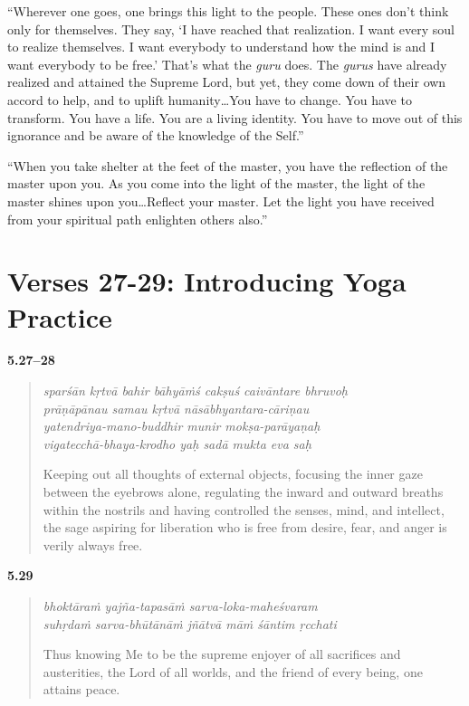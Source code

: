 \enquote{Wherever one goes, one brings this light to the people. These ones don’t think only for themselves. They say, \enquote{I have reached that realization. I want every soul to realize themselves. I want everybody to understand how the mind is and I want everybody to be free.} That’s what the \textit{guru} does. The \textit{gurus} have already realized and attained the Supreme Lord, but yet, they come down of their own accord to help, and to uplift humanity\ldots You have to change. You have to transform. You have a life. You are a living identity. You have to move out of this ignorance and be aware of the knowledge of the Self.}

\enquote{When you take shelter at the feet of the master, you have the reflection of the master upon you. As you come into the light of the master, the light of the master shines upon you\ldots Reflect your master. Let the light you have received from your spiritual path enlighten others also.}

\section{Verses 27-29: Introducing Yoga Practice}\label{sec-verses-27-29-introducing-yoga-practice}


\par\noindent\textbf{5.27–28}\par
\begin{verse}
\textit{sparśān kṛtvā bahir bāhyāṁś cakṣuś caivāntare bhruvoḥ} \\
\textit{prāṇāpānau samau kṛtvā nāsābhyantara-cāriṇau} \\
\textit{yatendriya-mano-buddhir munir mokṣa-parāyaṇaḥ} \\
\textit{vigatecchā-bhaya-krodho yaḥ sadā mukta eva saḥ}

\noindent Keeping out all thoughts of external objects, focusing the inner gaze between the eyebrows alone, regulating the inward and outward breaths within the nostrils and having controlled the senses, mind, and intellect, the sage aspiring for liberation who is free from desire, fear, and anger is verily always free.
\end{verse}
\par



\par\noindent\textbf{5.29}\par
\begin{verse}
\textit{bhoktāraṁ yajña-tapasāṁ sarva-loka-maheśvaram} \\
\textit{suhṛdaṁ sarva-bhūtānāṁ jñātvā māṁ śāntim ṛcchati}

\noindent Thus knowing Me to be the supreme enjoyer of all sacrifices and austerities, the Lord of all worlds, and the friend of every being, one attains peace.
\end{verse}
\par


